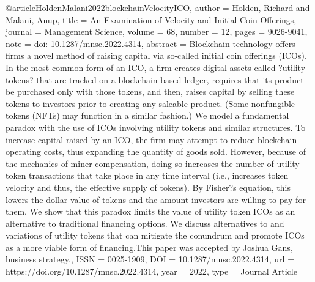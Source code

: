 {{{@article{HoldenMalani2022blockchainVelocityICO,
   author = {Holden, Richard and Malani, Anup},
   title = {An Examination of Velocity and Initial Coin Offerings},
   journal = {Management Science},
   volume = {68},
   number = {12},
   pages = {9026-9041},
   note = {doi: 10.1287/mnsc.2022.4314},
   abstract = {Blockchain technology offers firms a novel method of raising capital via so-called initial coin offerings (ICOs). In the most common form of an ICO, a firm creates digital assets called ?utility tokens? that are tracked on a blockchain-based ledger, requires that its product be purchased only with those tokens, and then, raises capital by selling these tokens to investors prior to creating any saleable product. (Some nonfungible tokens (NFTs) may function in a similar fashion.) We model a fundamental paradox with the use of ICOs involving utility tokens and similar structures. To increase capital raised by an ICO, the firm may attempt to reduce blockchain operating costs, thus expanding the quantity of goods sold. However, because of the mechanics of miner compensation, doing so increases the number of utility token transactions that take place in any time interval (i.e., increases token velocity and thus, the effective supply of tokens). By Fisher?s equation, this lowers the dollar value of tokens and the amount investors are willing to pay for them. We show that this paradox limits the value of utility token ICOs as an alternative to traditional financing options. We discuss alternatives to and variations of utility tokens that can mitigate the conundrum and promote ICOs as a more viable form of financing.This paper was accepted by Joshua Gans, business strategy.},
   ISSN = {0025-1909},
   DOI = {10.1287/mnsc.2022.4314},
   url = {https://doi.org/10.1287/mnsc.2022.4314},
   year = {2022},
   type = {Journal Article}
}

}}}
